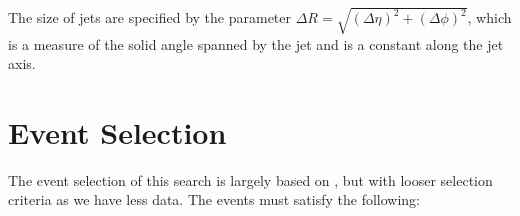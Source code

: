 \documentclass{article}
\begin{document}
\begin{titlepage}
The size of jets are specified by the parameter $\Delta R = \sqrt{(\Delta \eta)^2 + (\Delta \phi)^2}$, which is a measure of the solid angle spanned by the jet and is a constant along the jet axis.






\section{Event Selection}\label{sec:event_selection}









The event selection of this search is largely based on \cite{mainArt}, but with looser selection criteria as we have less data. The events must satisfy the following: 


\end{titlepage}
\end{document}
